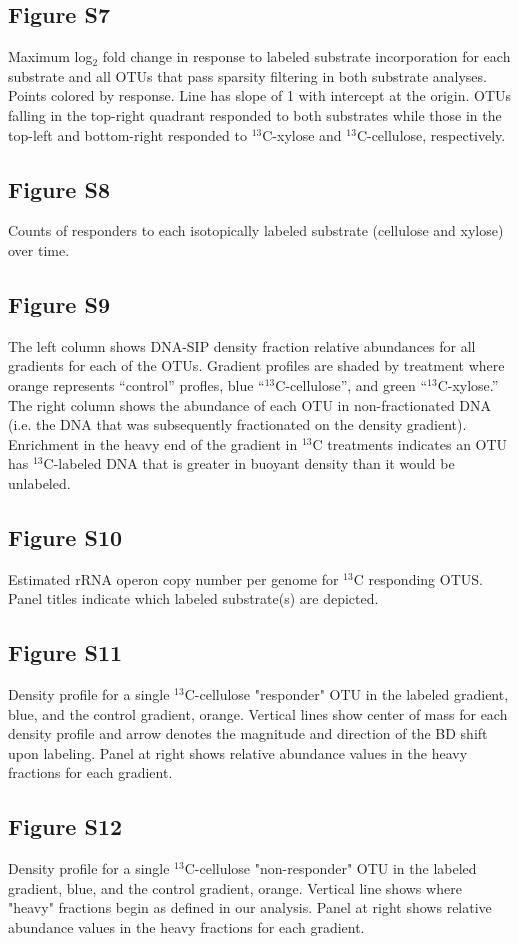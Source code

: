     \subsection{Figure S7}
Maximum log$_{2}$ fold change in response to labeled substrate incorporation for each substrate and all OTUs that pass sparsity filtering in both substrate analyses. Points colored by response. Line has slope of 1 with intercept at the origin. OTUs falling in the top-right quadrant responded to both substrates while those in the top-left and bottom-right responded to $^{13}$C-xylose and $^{13}$C-cellulose, respectively.  \subsection{Figure S8}
Counts of responders to each isotopically labeled substrate (cellulose and xylose) over time.\subsection{Figure S9}
The left column shows DNA-SIP density fraction relative abundances for all  gradients for each of the OTUs. Gradient profiles are shaded by treatment where orange represents ``control'' profles, blue ``$^{13}$C-cellulose'', and green ``$^{13}$C-xylose.'' The right column shows the abundance of each OTU in non-fractionated DNA (i.e. the DNA that was subsequently fractionated on the density gradient). Enrichment in the heavy end of the gradient in $^{13}$C treatments indicates an OTU has $^{13}$C-labeled DNA that is greater in buoyant density than it would be unlabeled. \subsection{Figure S10}
Estimated rRNA operon copy number per genome for $^{13}$C responding OTUS. Panel titles indicate which labeled substrate(s) are depicted.\subsection{Figure S11}
Density profile for a single $^{13}$C-cellulose "responder" OTU in the labeled gradient, blue, and the control gradient, orange. Vertical lines show center of mass for each density profile and arrow denotes the magnitude and direction of the BD shift upon labeling. Panel at right shows relative abundance values in the heavy fractions for each gradient. \subsection{Figure S12}
Density profile for a single $^{13}$C-cellulose "non-responder" OTU in the labeled gradient, blue, and the control gradient, orange. Vertical line shows where "heavy" fractions begin as defined in our analysis. Panel at right shows relative abundance values in the heavy fractions for each gradient.